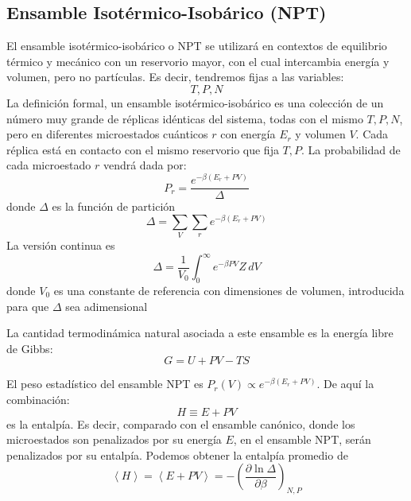 \documentclass[]{article}
\numberwithin{equation}{section}
\newcommand{\deriv}[3]{\left(\frac{\partial #1}{\partial #2} \right)_{#3}}
\newcommand{\0}{\textcolor{gray}{0}}
\newcommand{\pr}[1]{\left\langle #1 \right\rangle }
\begin{document}
\subsection{Ensamble Isotérmico-Isobárico (NPT)}
El ensamble isotérmico-isobárico o NPT se utilizará en contextos de equilibrio térmico y mecánico con un reservorio mayor, con el cual intercambia energía y volumen, pero no partículas. Es decir, tendremos fijas a las variables:
\begin{equation*}
	T, P, N
\end{equation*}
La definición formal, un ensamble isotérmico-isobárico es una colección de un número muy grande de réplicas idénticas del sistema, todas con el mismo \(T, P, N\), pero en diferentes microestados cuánticos \(r\) con energía \(E_r\) y volumen \(V\). Cada réplica está en contacto con el mismo reservorio que fija \(T, P\). La probabilidad de cada microestado \(r\) vendrá dada por:
\begin{equation}
	P_r = \frac{e^{- \beta\left(E_{r} + PV\right)}}{\Delta}
\end{equation}
donde \(\Delta\) es la función de partición
\begin{equation}
	\Delta = \sum_{V} \sum_{r} e^{-\beta\left(E_r + PV\right)}
\end{equation}
La versión continua es
\begin{equation}
	\Delta = \frac{1}{V_0}\int_{0}^{\infty} e^{-\beta PV} Z \, dV \label{NPT_continua}
\end{equation}
donde \(V_0\) es una constante de referencia con dimensiones de volumen, introducida para que \(\Delta\) sea adimensional

La cantidad termodinámica natural asociada a este ensamble es la energía libre de Gibbs:
\begin{equation*}
	G = U + PV - TS
\end{equation*}

El peso estadístico del ensamble NPT es \(P_r(V) \propto e^{- \beta\left(E_{r} + PV\right)}\). De aquí la combinación:
\begin{equation*}
	H \equiv E + PV
\end{equation*}
es la entalpía. Es decir, comparado con el ensamble canónico, donde los microestados son penalizados por su energía \(E\), en el ensamble NPT, serán penalizados por su entalpía. Podemos obtener la entalpía promedio de
\begin{equation}
	\pr{H} = \pr{E + PV} = -\deriv{\ln\Delta}{\beta}{N,P}
\end{equation}
\end{document}
